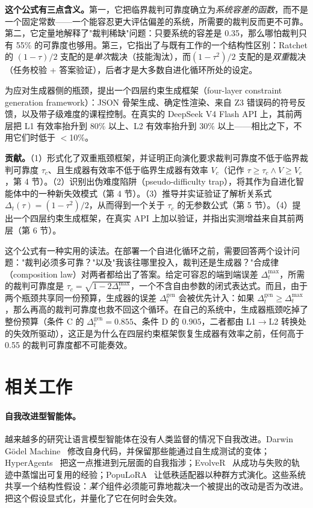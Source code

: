 \documentclass{article}
\begin{document}
\textbf{这个公式有三点含义。}第一，它把临界裁判可靠度确立为\textit{系统容差的函数}，而不是一个固定常数——一个能容忍更大评估偏差的系统，所需要的裁判反而更不可靠。第二，它定量地解释了"裁判稀缺"问题：只要系统的容差是 0.35，那么哪怕裁判只有 55\% 的可靠度也够用。第三，它指出了与既有工作的一个结构性区别：Ratchet 的 $(1-\tau)/2$ 支配的是\textit{单次}裁决（技能淘汰），而$(1-\tau^2)/2$ 支配的是\textit{双重}裁决（任务校验 + 答案验证），后者才是大多数自进化循环所处的设定。

为应对生成器侧的瓶颈，提出一个四层约束生成框架（four-layer constraint generation framework）：JSON 骨架生成、确定性渲染、来自 Z3 错误码的符号反馈，以及带子级难度的课程控制。在真实的 DeepSeek V4 Flash API 上，其前两层把 L1 有效率抬升到 80\% 以上、L2 有效率抬升到 30\% 以上——相比之下，不用它们时低于 $<$10\%。

\textbf{贡献。}（1）形式化了双重瓶颈框架，并证明正向演化要求裁判可靠度不低于临界裁判可靠度 $\tau_c$、且生成器有效率不低于临界生成器有效率 $V_c$（记作 $\tau \ge \tau_c \land V \ge V_c$，第 4 节）。（2）识别出伪难度陷阱（pseudo-difficulty trap），将其作为自进化智能体中的一种新失效模式（第 4 节）。（3）推导并实证验证了解析关系式 $\Delta_t(\tau) = (1-\tau^2)/2$，从而得到一个关于 $\tau_c$ 的无参数公式（第 5 节）。（4）提出一个四层约束生成框架，在真实 API 上加以验证，并指出实测增益来自其前两层（第 6 节）。

这个公式有一种实用的读法。在部署一个自进化循环之前，需要回答两个设计问题："裁判必须多可靠？"以及"我该往哪里投入，裁判还是生成器？"合成律（composition law）对两者都给出了答案。给定可容忍的端到端误差 $\Delta_t^{\max}$，所需的裁判可靠度是 $\tau_c = \sqrt{1 - 2\Delta_t^{\max}}$，一个不含自由参数的闭式表达式。而且，由于两个瓶颈共享同一份预算，生成器的误差 $\Delta_t^{\mathrm{gen}}$ 会被优先计入：如果 $\Delta_t^{\mathrm{gen}} \ge \Delta_t^{\max}$，那么再高的裁判可靠度也救不回这个循环。在自己的系统中，生成器瓶颈吃掉了整份预算（条件 C 的 $\Delta_t^{\mathrm{gen}} = 0.855$、条件 D 的 $0.905$，二者都由 L1$\to$L2 转换处的失效所驱动），这正是为什么在四层约束框架恢复生成器有效率之前，任何高于 0.55 的裁判可靠度都不可能奏效。

\section{相关工作}

\paragraph{自我改进型智能体。}
越来越多的研究让语言模型智能体在没有人类监督的情况下自我改进。Darwin Gödel Machine~\cite{dgm} 修改自身代码，并保留那些能通过自生成测试的变体；HyperAgents~\cite{hyperagents} 把这一点推进到元层面的自我指涉；EvolveR~\cite{evolver} 从成功与失败的轨迹中蒸馏出可复用的经验；PopuLoRA~\cite{populora} 让低秩适配器以种群方式演化。这些系统共享一个结构性假设：\emph{某个}组件必须能可靠地裁决一个被提出的改动是否为改进。把这个假设显式化，并量化了它在何时会失效。
\end{document}
